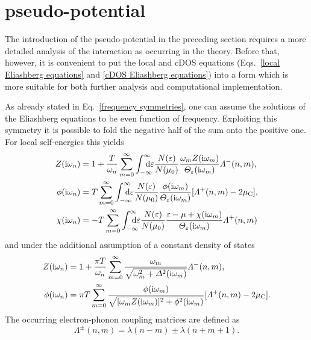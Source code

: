 \section{ pseudo-potential}

The introduction of the  pseudo-potential in the preceding section
requires a more detailed analysis of the  interaction as occurring
in the  theory. Before that, however, it is convenient to put
the local and cDOS  equations (Eqs.~\ref{local Eliashberg
equations} and \ref{cDOS Eliashberg equations}) into a form which is more
suitable for both further analysis and computational implementation.

As already stated in Eq.~\ref{frequency symmetries}, one can assume the
solutions of the Eliashberg equations to be even function of frequency.
Exploiting this symmetry it is possible to fold the negative half of the
 sum onto the positive one. For local self-energies this yields
%
\begin{align*}
    Z(\I \omega_n) &= 1 + \frac T {\omega_n} \sum_{m = 0}^\infty
    \int \from{-\infty} \till \infty \D \epsilon
    \frac{N(\epsilon)}{N(\mu_0)}
    \frac{\omega_m Z (\I \omega_m)}{\Theta_\epsilon(\I \omega_m)}
    \Lambda^-(n, m),
    \\
    \phi(\I \omega_n) &= T \sum_{m = 0}^\infty
    \int \from{-\infty} \till \infty \D \epsilon
    \frac{N(\epsilon)}{N(\mu_0)}
    \frac{\phi(\I \omega_m)}{\Theta_\epsilon(\I \omega_m)}
    [\Lambda^+(n, m) - 2 \mu \sub C],
    \\
    \chi(\I \omega_n) &= -T \sum_{m = 0}^\infty
    \int \from{-\infty} \till \infty \D \epsilon
    \frac{N(\epsilon)}{N(\mu_0)}
    \frac{\epsilon - \mu + \chi(\I \omega_m)}{\Theta_\epsilon(\I \omega_m)}
    \Lambda^+(n, m)
\end{align*}
%
and under the additional assumption of a constant density of states
%
\begin{align*}
    Z(\mathrm i \omega_n) &= 1 + \frac{\pi T}{\omega_n} \sum_{m = 0}^\infty
    \frac{\omega_m}{\sqrt{\omega_m^2 + \varDelta^2(\mathrm i \omega_m)}}
    \varLambda^-(n, m),
    \\
    \phi(\mathrm i \omega_n) &= \pi T \sum_{m = 0}^\infty
    \frac
        {\phi(\mathrm i \omega_m)}
        {\sqrt{[\omega_m Z(\mathrm i \omega_m)]^2 + \phi^2(\mathrm i \omega_m)}}
    [\varLambda^+(n, m) - 2 \mu \sb{\text{C}}].
\end{align*}
%
The occurring electron-phonon coupling matrices are defined as
%
\begin{equation*}
    \Lambda^\pm(n, m) = \lambda(n - m) \pm \lambda(n + m + 1).
\end{equation*}

